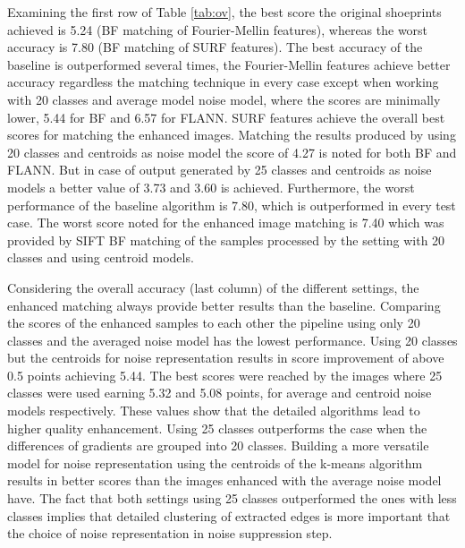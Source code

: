 \documentclass[draft,final]{vutinfth} %
\begin{document}
\par
Examining the first row of Table \ref{tab:ov}, the best score the original shoeprints achieved is 5.24 (BF matching of Fourier-Mellin features), whereas the worst accuracy is 7.80 (BF matching of SURF features).
The best accuracy of the baseline is outperformed several times, the Fourier-Mellin features achieve better accuracy regardless the matching technique in every case except when working with 20 classes and average model noise model, where the scores are minimally lower, 5.44 for BF and 6.57 for FLANN.
SURF features achieve the overall best scores for matching the enhanced images.
Matching the results produced by using 20 classes and centroids as noise model the score of 4.27 is noted for both BF and FLANN.
But in case of output generated by 25 classes and centroids as noise models a better value of 3.73 and 3.60 is achieved.
Furthermore, the worst performance of the baseline algorithm is 7.80, which is outperformed in every test case.
The worst score noted for the enhanced image matching is 7.40 which was provided by SIFT BF matching of the samples processed by the setting with 20 classes and using centroid models.

\par
Considering the overall accuracy (last column) of the different settings, the enhanced matching always provide better results than the baseline.
Comparing the scores of the enhanced samples to each other the pipeline using only 20 classes and the averaged noise model has the lowest performance.
Using 20 classes but the centroids for noise representation results in score improvement of above 0.5 points achieving 5.44.
The best scores were reached by the images where 25 classes were used earning 5.32 and 5.08 points, for average and centroid noise models respectively.
These values show that the detailed algorithms lead to higher quality enhancement.
Using 25 classes outperforms the case when the differences of gradients are grouped into 20 classes.
Building a more versatile model for noise representation using the centroids of the k-means algorithm results in better scores than the images enhanced with the average noise model have.
The fact that both settings using 25 classes outperformed the ones with less classes implies that detailed clustering of extracted edges is more important that the  choice of noise representation in noise suppression step.
\end{document}
